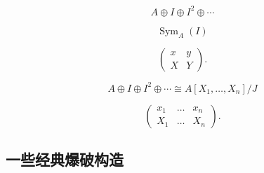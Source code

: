 \[
	A\oplus I \oplus I^2\oplus \cdots
\]

\[
	\operatorname{Sym}_A(I)
\]

\[
	\begin{pmatrix}
		x&y\\
		X&Y
	\end{pmatrix}.
\]

\[
	A\oplus I \oplus I^2\oplus \cdots\cong A[X_1,\dots,X_n]/J
\]

\[
	\begin{pmatrix}
		x_1&\dots&x_n\\
		X_1&\dots&X_n
	\end{pmatrix}.
\]

\subsection{一些经典爆破构造}\label{s:4.2.2}
